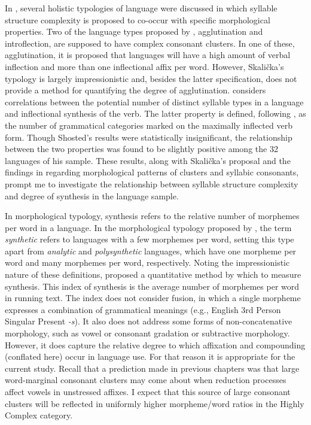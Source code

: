   In , several holistic typologies of language were discussed in which syllable structure complexity is proposed to co-occur with specific morphological properties. Two of the language types proposed by \citet{Skalička1979}, agglutination and introflection, are supposed to have complex consonant clusters. In one of these, agglutination, it is proposed that languages will have a high amount of verbal inflection and more than one inflectional affix per word. However, Skalička’s typology is largely impressionistic and, besides the latter specification, does not provide a method for quantifying the degree of agglutination. \citet{Shosted2006} considers correlations between the potential number of distinct syllable types in a language and inflectional synthesis of the verb. The latter property is defined, following \citet{BickelNichols2005}, as the number of grammatical categories marked on the maximally inflected verb form. Though Shosted’s results were statistically insignificant, the relationship between the two properties was found to be slightly positive among the 32 languages of his sample. These results, along with Skalička’s proposal and the findings in  regarding morphological patterns of clusters and syllabic consonants, prompt me to investigate the relationship between syllable structure complexity and degree of synthesis in the language sample.

  In morphological typology, synthesis refers to the relative number of morphemes per word in a language. In the morphological typology proposed by \citet{Sapir1921}, the term \textit{synthetic} refers to languages with a few morphemes per word, setting this type apart from \textit{analytic} and \textit{polysynthetic} languages, which have one morpheme per word and many morphemes per word, respectively. Noting the impressionistic nature of these definitions, \citet{Greenberg1954} proposed a quantitative method by which to measure synthesis. This index of synthesis is the average number of morphemes per word in running text. The index does not consider fusion, in which a single morpheme expresses a combination of grammatical meanings (e.g., English 3rd Person Singular Present \textit{-s}). It also does not address some forms of non-concatenative morphology, such as vowel or consonant gradation or subtractive morphology. However, it does capture the relative degree to which affixation and compounding (conflated here) occur in language use. For that reason it is appropriate for the current study. Recall that a prediction made in previous chapters was that large word-marginal consonant clusters may come about when reduction processes affect vowels in unstressed affixes. I expect that this source of large consonant clusters will be reflected in uniformly higher morpheme/word ratios in the Highly Complex category.

